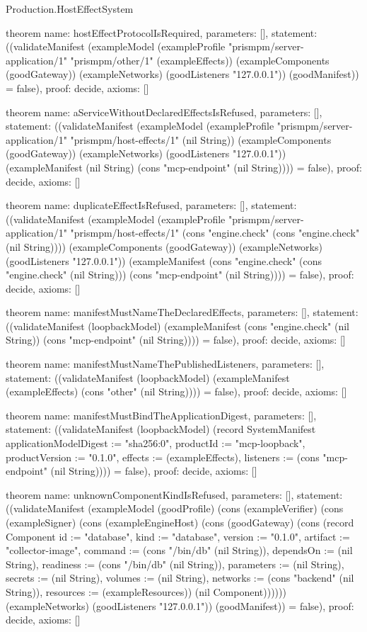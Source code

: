 \begin{lexlean}{Production.HostEffectSystem}
\begin{semanticmodule}
theorem{
  name: hostEffectProtocolIsRequired,
  parameters: [],
  statement: ((validateManifest (exampleModel (exampleProfile "prismpm/server-application/1" "prismpm/other/1" (exampleEffects)) (exampleComponents (goodGateway)) (exampleNetworks) (goodListeners "127.0.0.1")) (goodManifest)) = false),
  proof: decide{},
  axioms: []
}

theorem{
  name: aServiceWithoutDeclaredEffectsIsRefused,
  parameters: [],
  statement: ((validateManifest (exampleModel (exampleProfile "prismpm/server-application/1" "prismpm/host-effects/1" (nil String)) (exampleComponents (goodGateway)) (exampleNetworks) (goodListeners "127.0.0.1")) (exampleManifest (nil String) (cons "mcp-endpoint" (nil String)))) = false),
  proof: decide{},
  axioms: []
}

theorem{
  name: duplicateEffectIsRefused,
  parameters: [],
  statement: ((validateManifest (exampleModel (exampleProfile "prismpm/server-application/1" "prismpm/host-effects/1" (cons "engine.check" (cons "engine.check" (nil String)))) (exampleComponents (goodGateway)) (exampleNetworks) (goodListeners "127.0.0.1")) (exampleManifest (cons "engine.check" (cons "engine.check" (nil String))) (cons "mcp-endpoint" (nil String)))) = false),
  proof: decide{},
  axioms: []
}

theorem{
  name: manifestMustNameTheDeclaredEffects,
  parameters: [],
  statement: ((validateManifest (loopbackModel) (exampleManifest (cons "engine.check" (nil String)) (cons "mcp-endpoint" (nil String)))) = false),
  proof: decide{},
  axioms: []
}

theorem{
  name: manifestMustNameThePublishedListeners,
  parameters: [],
  statement: ((validateManifest (loopbackModel) (exampleManifest (exampleEffects) (cons "other" (nil String)))) = false),
  proof: decide{},
  axioms: []
}

theorem{
  name: manifestMustBindTheApplicationDigest,
  parameters: [],
  statement: ((validateManifest (loopbackModel) (record SystemManifest {applicationModelDigest := "sha256:0", productId := "mcp-loopback", productVersion := "0.1.0", effects := (exampleEffects), listeners := (cons "mcp-endpoint" (nil String))})) = false),
  proof: decide{},
  axioms: []
}

theorem{
  name: unknownComponentKindIsRefused,
  parameters: [],
  statement: ((validateManifest (exampleModel (goodProfile) (cons (exampleVerifier) (cons (exampleSigner) (cons (exampleEngineHost) (cons (goodGateway) (cons (record Component {id := "database", kind := "database", version := "0.1.0", artifact := "collector-image", command := (cons "/bin/db" (nil String)), dependsOn := (nil String), readiness := (cons "/bin/db" (nil String)), parameters := (nil String), secrets := (nil String), volumes := (nil String), networks := (cons "backend" (nil String)), resources := (exampleResources)}) (nil Component)))))) (exampleNetworks) (goodListeners "127.0.0.1")) (goodManifest)) = false),
  proof: decide{},
  axioms: []
}


\end{semanticmodule}
\end{lexlean}

